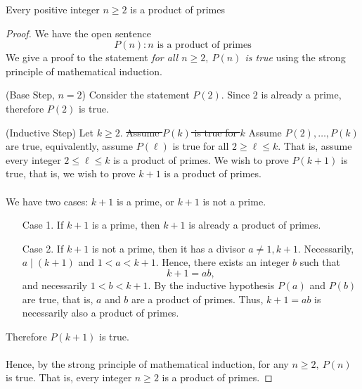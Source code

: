 \begin{theorem}
Every positive integer $n \geq 2$ is a product of primes
\end{theorem}
\begin{proof}
We have the open sentence
\[P(n):n \text{ is a product of primes}\]
We give a proof to the statement \emph{for all $n \geq 2,\ P(n)$ is true} using the strong principle of mathematical induction.
\item[] (Base Step, $n = 2$) Consider the statement $P(2)$. Since $2$ is already a prime, therefore $P(2)$ is true.\\
\item[] (Inductive Step) Let $k \geq 2$. \st{Assume $P(k)$ is true for $k$} Assume $P(2),\ldots,P(k)$ are true, equivalently, assume $P(\ell)$ is true for all $2 \geq \ell \leq k$. That is, assume every integer $2 \leq \ell \leq k$ is a product of primes. We wish to prove $P(k+1)$ is true, that is, we wish to prove $k + 1$ is a product of primes.\\
\\
We have two cases: $k + 1$ is a prime, or $k + 1$ is not a prime.
\begin{itemize}[itemsep = 1em,leftmargin=4em]
\item[Case 1.] If $k + 1$ is a prime, then $k + 1$ is already a product of primes. 
\item[Case 2.] If $k + 1$ is not a prime, then it has a divisor $a \neq 1,k+1$. Necessarily, $a\mid (k+1)$ and $1 < a < k+1$. Hence, there exists an integer $b$ such that \[k + 1 = ab,\]
and necessarily $1 < b < k + 1$. By the inductive hypothesis $P(a)$ and $P(b)$ are true, that is, $a$ and $b$ are a product of primes. Thus, $k + 1 = ab$ is necessarily also a product of primes.
\end{itemize}
Therefore $P(k+1)$ is true.\\
\\
Hence, by the strong principle of mathematical induction, for any $n \geq 2,\ P(n)$ is true. That is, every integer $n \geq 2$ is a product of primes.
\end{proof}